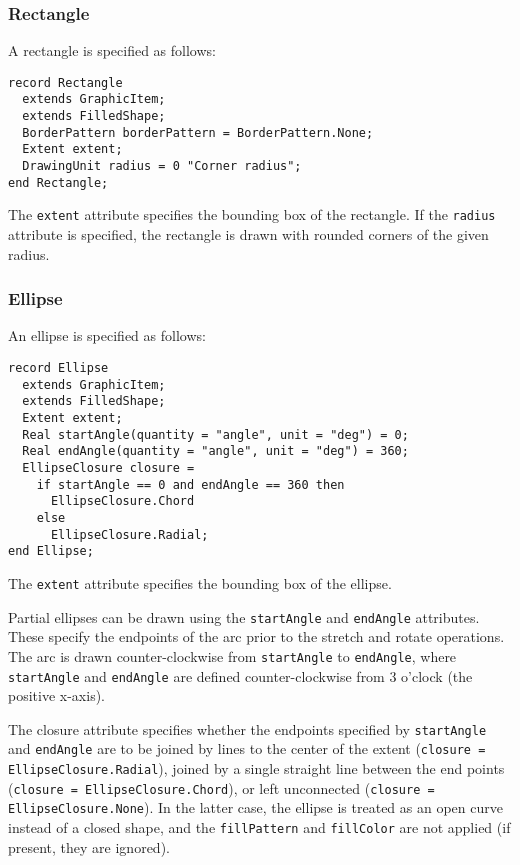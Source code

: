 \subsubsection{Rectangle}\label{rectangle}

A rectangle is specified as follows:
\begin{lstlisting}[language=modelica]
record Rectangle
  extends GraphicItem;
  extends FilledShape;
  BorderPattern borderPattern = BorderPattern.None;
  Extent extent;
  DrawingUnit radius = 0 "Corner radius";
end Rectangle;
\end{lstlisting}%
The \lstinline!extent! attribute specifies the bounding box of the rectangle.
If the \lstinline!radius! attribute is specified, the rectangle is drawn with rounded corners of the given radius.

\subsubsection{Ellipse}\label{ellipse}

An ellipse is specified as follows:
\begin{lstlisting}[language=modelica]
record Ellipse
  extends GraphicItem;
  extends FilledShape;
  Extent extent;
  Real startAngle(quantity = "angle", unit = "deg") = 0;
  Real endAngle(quantity = "angle", unit = "deg") = 360;
  EllipseClosure closure =
    if startAngle == 0 and endAngle == 360 then
      EllipseClosure.Chord
    else
      EllipseClosure.Radial;
end Ellipse;
\end{lstlisting}%
The \lstinline!extent! attribute specifies the bounding box of the ellipse.

Partial ellipses can be drawn using the \lstinline!startAngle! and \lstinline!endAngle! attributes.
These specify the endpoints of the arc prior to the stretch and rotate operations.
The arc is drawn counter-clockwise from \lstinline!startAngle! to \lstinline!endAngle!, where \lstinline!startAngle! and \lstinline!endAngle! are defined counter-clockwise from 3 o'clock (the positive x-axis).

The closure attribute specifies whether the endpoints specified by \lstinline!startAngle! and \lstinline!endAngle! are to be joined by lines to the center of the extent (\lstinline!closure = EllipseClosure.Radial!), joined by a single straight line between the end points (\lstinline!closure = EllipseClosure.Chord!), or left unconnected (\lstinline!closure = EllipseClosure.None!).
In the latter case, the ellipse is treated as an open curve instead of a closed shape, and the \lstinline!fillPattern! and \lstinline!fillColor! are not applied (if present, they are ignored).

